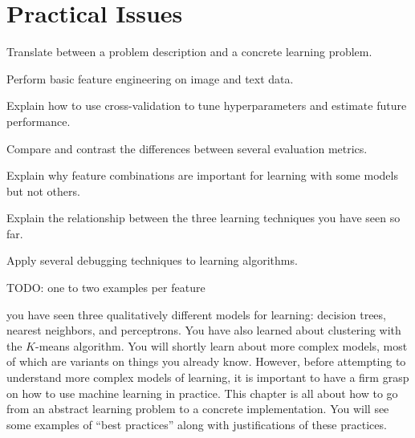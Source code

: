 \chapter{Practical Issues} \label{sec:prac}



\begin{learningobjectives}
\item Translate between a problem description and a concrete learning
  problem.
\item Perform basic feature engineering on image and text data.
\item Explain how to use cross-validation to tune hyperparameters and
  estimate future performance.
\item Compare and contrast the differences between several evaluation
  metrics.
\item Explain why feature combinations are important for learning with
  some models but not others.
\item Explain the relationship between the three learning techniques
  you have seen so far.
\item Apply several debugging techniques to learning algorithms.
\end{learningobjectives}

TODO: one to two examples per feature


 you have seen three qualitatively
different models for learning: decision trees, nearest neighbors, and
perceptrons.  You have also learned about clustering with the
$K$-means algorithm.  You will shortly learn about more complex
models, most of which are variants on things you already know.
However, before attempting to understand more complex models of
learning, it is important to have a firm grasp on how to use machine
learning in practice.  This chapter is all about how to go from an
abstract learning problem to a concrete implementation.  You will see
some examples of ``best practices'' along with justifications of these
practices.

